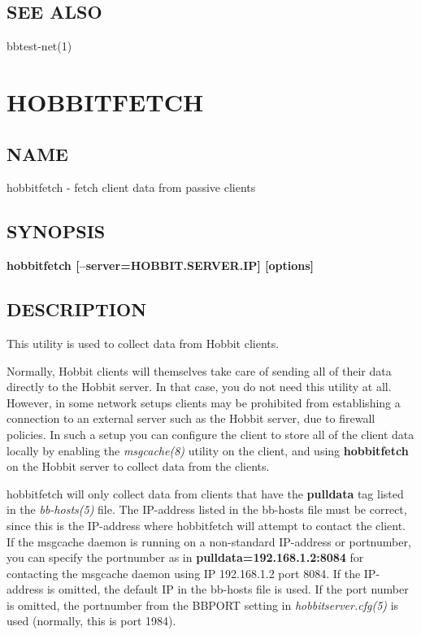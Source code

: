  
\subsection{SEE ALSO}
bbtest-net(1) 
  


%
\newpage
\section{HOBBITFETCH}
\subsection{NAME}
 hobbitfetch - fetch client data from passive clients \
\subsection{SYNOPSIS}
\textbf{hobbitfetch [--server=HOBBIT.SERVER.IP] [options]}


 
\subsection{DESCRIPTION}
 This utility is used to collect data from Hobbit clients. 

  Normally, Hobbit clients will themselves take care of sending all of
  their data directly to the Hobbit server. In that case, you do not
  need this utility at all. However, in some network setups clients
  may be prohibited from establishing a connection to an external
  server such as the Hobbit server, due to firewall policies. In such
  a setup you can configure the client to store all of the client data
  locally by enabling the \emph{msgcache(8)} utility on the client,
  and using \textbf{hobbitfetch} on the Hobbit server to collect data
  from the clients. 



  hobbitfetch will only collect data from clients that have the
  \textbf{pulldata} tag listed in the \emph{bb-hosts(5)} file. The
  IP-address listed in the bb-hosts file must be correct, since this
  is the IP-address where hobbitfetch will attempt to contact the
  client. If the msgcache daemon is running on a non-standard
  IP-address or portnumber, you can specify the portnumber as in
  \textbf{pulldata=192.168.1.2:8084} for contacting the msgcache
  daemon using IP 192.168.1.2 port 8084. If the IP-address is omitted,
  the default IP in the bb-hosts file is used. If the port number is
  omitted, the portnumber from the BBPORT setting in
  \emph{hobbitserver.cfg(5)} is used (normally, this is port 1984). 



